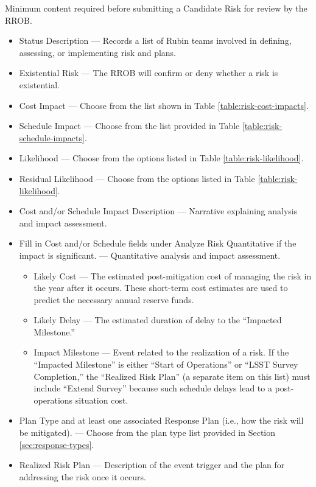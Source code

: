 Minimum content required before submitting a Candidate Risk for review by the RROB.
\begin{itemize}
	\item Status Description --- Records a list of Rubin teams involved in defining, assessing, or implementing risk and plans.
	\item Existential Risk --- The RROB will confirm or deny whether a risk is existential.
	\item Cost Impact --- Choose from the list shown in Table \ref{table:risk-cost-impacts}.
	\item Schedule Impact --- Choose from the list provided in Table \ref{table:risk-schedule-impacts}.
	\item Likelihood --- Choose from the options listed in Table \ref{table:risk-likelihood}.
	\item Residual Likelihood --- Choose from the options listed in Table \ref{table:risk-likelihood}.
	\item Cost and/or Schedule Impact Description --- Narrative explaining analysis and impact assessment.
	\item Fill in Cost and/or Schedule fields under Analyze Risk Quantitative if the impact is significant. --- Quantitative analysis and impact assessment.
		\begin{itemize}
			\item Likely Cost --- The estimated post-mitigation cost of managing the risk in the year after it occurs. These short-term cost estimates are used to predict the necessary annual reserve funds.
			\item Likely Delay --- The estimated duration of delay to the ``Impacted Milestone.''
			\item Impact Milestone --- Event related to the realization of a risk. If the ``Impacted Milestone'' is either ``Start of Operations'' or ``LSST Survey Completion,'' the ``Realized Risk Plan'' (a separate item on this list) must include ``Extend Survey'' because such schedule delays lead to a post-operations situation cost.
		\end{itemize}
	\item Plan Type and at least one associated Response Plan (i.e., how the risk will be mitigated). --- Choose from the plan type list provided in Section \ref{sec:response-types}.
	\item Realized Risk Plan --- Description of the event trigger and the plan for addressing the risk once it occurs.
\end{itemize}

